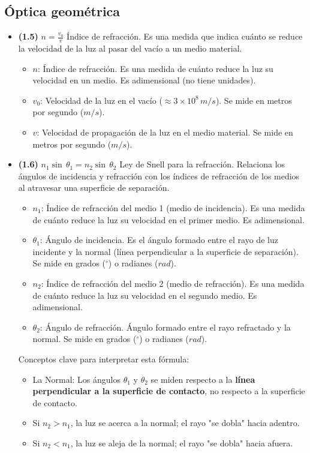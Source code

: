 \documentclass{article}
\begin{document}
		\subsection*{Óptica geométrica}
			\begin{itemize}
				\item \textbf{(1.5)} $\boxed{n=\frac{v_{0}}{v}}$ Índice de refracción. Es una medida que indica cuánto se reduce la velocidad de la luz al pasar del vacío a un medio material.
					\begin{itemize}
						\item $n$: Índice de refracción. Es una medida de cuánto reduce la luz su velocidad en un medio. Es adimensional (no tiene unidades).
						\item $v_0$: Velocidad de la luz en el vacío ($\approx 3 \times 10^8 \, m/s$). Se mide en metros por segundo ($m/s$).
						\item $v$: Velocidad de propagación de la luz en el medio material. Se mide en metros por segundo ($m/s$).
					\end{itemize}

				\item \textbf{(1.6)} $\boxed{n_{1}\sin\,\theta_{1}=n_{2}\sin\,\theta_{2}}$ Ley de Snell para la refracción. Relaciona los ángulos de incidencia y refracción con los índices de refracción de los medios al atravesar una superficie de separación.
					\begin{itemize}
						\item $n_1$: Índice de refracción del medio 1 (medio de incidencia). Es una medida de cuánto reduce la luz su velocidad en el primer medio. Es adimensional.
						\item $\theta_1$: Ángulo de incidencia. Es el ángulo formado entre el rayo de luz incidente y la normal (línea perpendicular a la superficie de separación). Se mide en grados ($^\circ$) o radianes ($rad$).
						\item $n_2$: Índice de refracción del medio 2 (medio de refracción). Es una medida de cuánto reduce la luz su velocidad en el segundo medio. Es adimensional.
						\item $\theta_2$: Ángulo de refracción. Ángulo formado entre el rayo refractado y la normal. Se mide en grados ($^\circ$) o radianes ($rad$).
					\end{itemize}

					Conceptos clave para interpretar esta fórmula:
					\begin{itemize}
						\item La Normal: Los ángulos $\theta_1$ y $\theta_2$ se miden respecto a la \textbf{línea perpendicular a la superficie de contacto}, no respecto a la superficie de contacto.
						\item Si $n_2 > n_1$, la luz se acerca a la normal; el rayo "se dobla" hacia adentro.
						\item Si $n_2 < n_1$, la luz se aleja de la normal; el rayo "se dobla" hacia afuera.
					\end{itemize}


\end{itemize}
\end{document}
